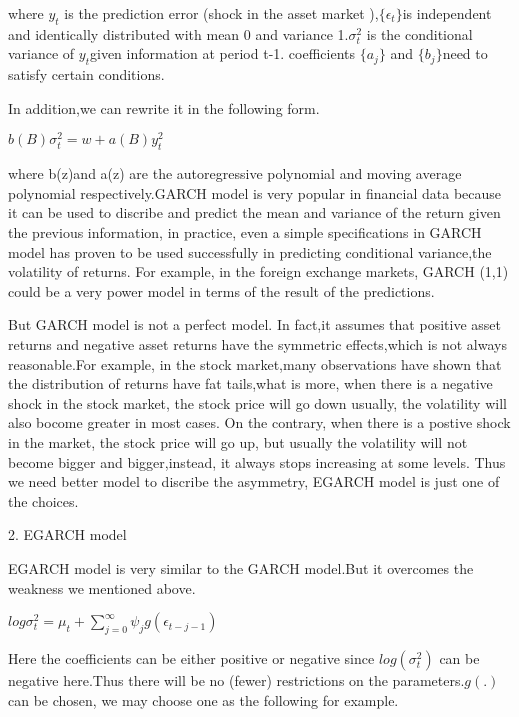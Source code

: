 \documentclass[10pt,a4paper]{article}
\begin{document}
where $y_t$ is the prediction error (shock in the asset market ),$ \{ \epsilon_t\} $is independent and identically distributed with mean 0 and variance 1.$\sigma^2_t$ is the conditional variance of $y_t $given information at period t-1.
coefficients $\{a_j\}$ and $\{b_j\}$need to satisfy certain conditions.

In addition,we can rewrite it in the following form.

\begin{center}$\displaystyle b(B)\sigma^2_t=w+a(B)y^2_t$\end{center} 

where b(z)and a(z) are the autoregressive polynomial and moving average polynomial respectively.GARCH model is very popular in financial data because it can be used to discribe and predict the mean and variance of the return given the previous information, in practice, even a simple specifications in GARCH model has proven to be used successfully in predicting conditional variance,the volatility of returns. For example, in the foreign exchange markets, GARCH (1,1) could be a very power model in terms of the result of the predictions.

  But GARCH model is not a perfect model. In fact,it assumes that positive asset returns and negative asset returns have the symmetric effects,which is not always reasonable.For example, in the stock market,many observations have shown that the distribution of returns have fat tails,what is more, when there is a negative shock in the stock market, the stock price will go down usually, the volatility will also bocome greater in most cases. On the contrary, when there is a postive shock in the market, the stock price will go up, but usually the volatility will not become bigger and bigger,instead, it always stops increasing at some levels. Thus we need better model to discribe the asymmetry, EGARCH model is just one of the choices.

\vspace{0.5cm}

2. EGARCH model

 EGARCH model is very similar to the GARCH model.But it overcomes the weakness we mentioned above. 

\begin{center}$\displaystyle log\sigma^2_t=\mu_t+\sum_{j=0}^{\infty}\psi_j g(\epsilon_{t-j-1}) $\end{center}

Here the coefficients can be either positive or negative since $log(\sigma^2_t)$ can be negative here.Thus there will be no (fewer) restrictions on the parameters.$g(.)$ can be chosen, we may choose one as the following for example.
 
\end{document}

